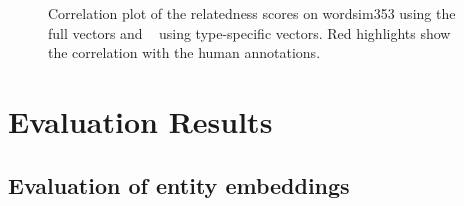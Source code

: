 \begin{figure}
\centering
{}

\caption{Correlation plot of the relatedness scores on wordsim353 using the~ full vectors and ~ using type-specific vectors. Red highlights show the correlation with the human annotations.}
\label{fig:wordsim_cor}
\end{figure}


\section{Evaluation Results}\label{sec:eval_results}
\subsection{Evaluation of entity embeddings}\label{subsec:eval_entity}
